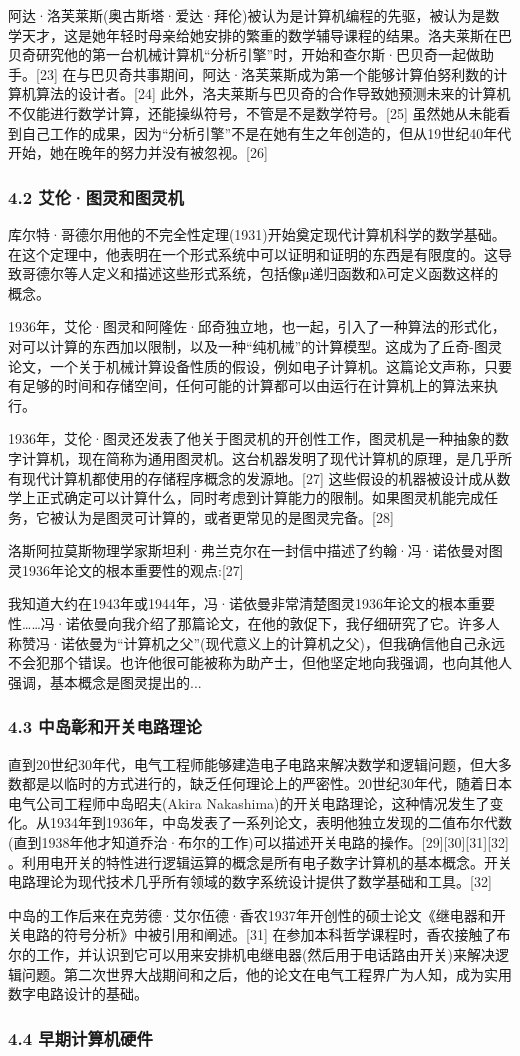 阿达·洛芙莱斯(奥古斯塔·爱达·拜伦)被认为是计算机编程的先驱，被认为是数学天才，这是她年轻时母亲给她安排的繁重的数学辅导课程的结果。洛夫莱斯在巴贝奇研究他的第一台机械计算机“分析引擎”时，开始和查尔斯·巴贝奇一起做助手。[23] 在与巴贝奇共事期间，阿达·洛芙莱斯成为第一个能够计算伯努利数的计算机算法的设计者。[24] 此外，洛夫莱斯与巴贝奇的合作导致她预测未来的计算机不仅能进行数学计算，还能操纵符号，不管是不是数学符号。[25] 虽然她从未能看到自己工作的成果，因为“分析引擎”不是在她有生之年创造的，但从19世纪40年代开始，她在晚年的努力并没有被忽视。[26]
\subsubsection{4.2 艾伦·图灵和图灵机}
库尔特·哥德尔用他的不完全性定理(1931)开始奠定现代计算机科学的数学基础。在这个定理中，他表明在一个形式系统中可以证明和证明的东西是有限度的。这导致哥德尔等人定义和描述这些形式系统，包括像μ递归函数和λ可定义函数这样的概念。

1936年，艾伦·图灵和阿隆佐·邱奇独立地，也一起，引入了一种算法的形式化，对可以计算的东西加以限制，以及一种“纯机械”的计算模型。这成为了丘奇-图灵论文，一个关于机械计算设备性质的假设，例如电子计算机。这篇论文声称，只要有足够的时间和存储空间，任何可能的计算都可以由运行在计算机上的算法来执行。

1936年，艾伦·图灵还发表了他关于图灵机的开创性工作，图灵机是一种抽象的数字计算机，现在简称为通用图灵机。这台机器发明了现代计算机的原理，是几乎所有现代计算机都使用的存储程序概念的发源地。[27] 这些假设的机器被设计成从数学上正式确定可以计算什么，同时考虑到计算能力的限制。如果图灵机能完成任务，它被认为是图灵可计算的，或者更常见的是图灵完备。[28]

洛斯阿拉莫斯物理学家斯坦利·弗兰克尔在一封信中描述了约翰·冯·诺依曼对图灵1936年论文的根本重要性的观点:[27]

我知道大约在1943年或1944年，冯·诺依曼非常清楚图灵1936年论文的根本重要性……冯·诺依曼向我介绍了那篇论文，在他的敦促下，我仔细研究了它。许多人称赞冯·诺依曼为“计算机之父”(现代意义上的计算机之父)，但我确信他自己永远不会犯那个错误。也许他很可能被称为助产士，但他坚定地向我强调，也向其他人强调，基本概念是图灵提出的...
\subsubsection{4.3 中岛彰和开关电路理论}
直到20世纪30年代，电气工程师能够建造电子电路来解决数学和逻辑问题，但大多数都是以临时的方式进行的，缺乏任何理论上的严密性。20世纪30年代，随着日本电气公司工程师中岛昭夫(Akira Nakashima)的开关电路理论，这种情况发生了变化。从1934年到1936年，中岛发表了一系列论文，表明他独立发现的二值布尔代数(直到1938年他才知道乔治·布尔的工作)可以描述开关电路的操作。[29][30][31][32] 。利用电开关的特性进行逻辑运算的概念是所有电子数字计算机的基本概念。开关电路理论为现代技术几乎所有领域的数字系统设计提供了数学基础和工具。[32]

中岛的工作后来在克劳德·艾尔伍德·香农1937年开创性的硕士论文《继电器和开关电路的符号分析》中被引用和阐述。[31] 在参加本科哲学课程时，香农接触了布尔的工作，并认识到它可以用来安排机电继电器(然后用于电话路由开关)来解决逻辑问题。第二次世界大战期间和之后，他的论文在电气工程界广为人知，成为实用数字电路设计的基础。
\subsubsection{4.4 早期计算机硬件}